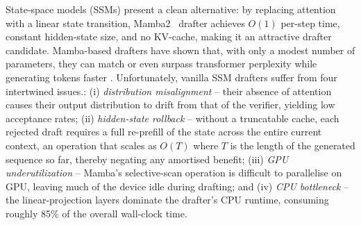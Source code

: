 State-space models (SSMs) present a clean alternative: by replacing attention with a linear state transition, Mamba2~\citep{dao2024transformers} drafter achieves $O(1)$ per-step time, constant hidden-state size, and no KV-cache, making it an attractive drafter candidate.
Mamba-based drafters have shown that, with only a modest number of parameters, they can match or even surpass transformer perplexity while generating tokens faster \citet{choi2025mamba}.
Unfortunately, vanilla SSM drafters suffer from four intertwined issues.:
(i) \emph{distribution misalignment} -- their absence of attention causes their output distribution to drift from that of the verifier, yielding low acceptance rates;
(ii) \emph{hidden-state rollback} -- without a truncatable cache, each rejected draft requires a full re-prefill of the state across the entire current context, an operation that scales as $O(T)$ where $T$ is the length of the generated sequence so far, thereby negating any amortised benefit;
(iii) \emph{GPU underutilization} -- Mamba's selective-scan operation is difficult to parallelise on GPU, leaving much of the device idle during drafting; and
(iv) \emph{CPU bottleneck} -- the linear-projection layers dominate the drafter's CPU runtime, consuming roughly 85\% of the overall wall-clock time.

